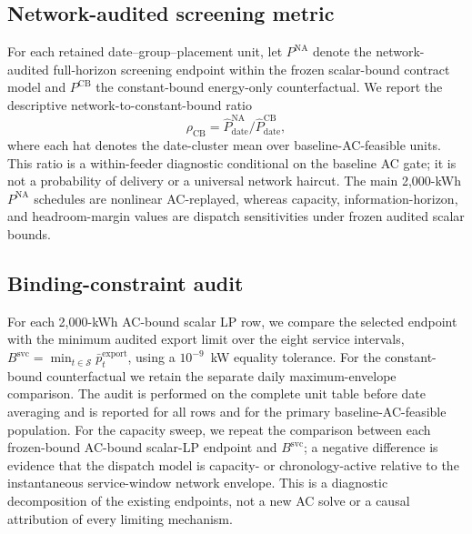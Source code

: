\documentclass[11pt]{article}
\begin{document}
\subsection{Network-audited screening metric}
For each retained date--group--placement unit, let $P^{\mathrm{NA}}$ denote the network-audited full-horizon screening endpoint within the frozen scalar-bound contract model and $P^{\mathrm{CB}}$ the constant-bound energy-only counterfactual. We report the descriptive network-to-constant-bound ratio
\begin{equation}
\rho_{\mathrm{CB}}=\widehat P^{\mathrm{NA}}_{\mathrm{date}}/\widehat P^{\mathrm{CB}}_{\mathrm{date}},
\end{equation}
where each hat denotes the date-cluster mean over baseline-AC-feasible units. This ratio is a within-feeder diagnostic conditional on the baseline AC gate; it is not a probability of delivery or a universal network haircut. The main 2,000-kWh $P^{\mathrm{NA}}$ schedules are nonlinear AC-replayed, whereas capacity, information-horizon, and headroom-margin values are dispatch sensitivities under frozen audited scalar bounds.

\subsection{Binding-constraint audit}
For each 2,000-kWh AC-bound scalar LP row, we compare the selected endpoint with the minimum audited export limit over the eight service intervals, $B^{\mathrm{svc}}=\min_{t\in\mathcal{S}}\bar p^{\mathrm{export}}_t$, using a $10^{-9}$~kW equality tolerance. For the constant-bound counterfactual we retain the separate daily maximum-envelope comparison. The audit is performed on the complete unit table before date averaging and is reported for all rows and for the primary baseline-AC-feasible population. For the capacity sweep, we repeat the comparison between each frozen-bound AC-bound scalar-LP endpoint and $B^{\mathrm{svc}}$; a negative difference is evidence that the dispatch model is capacity- or chronology-active relative to the instantaneous service-window network envelope. This is a diagnostic decomposition of the existing endpoints, not a new AC solve or a causal attribution of every limiting mechanism.
\end{document}
